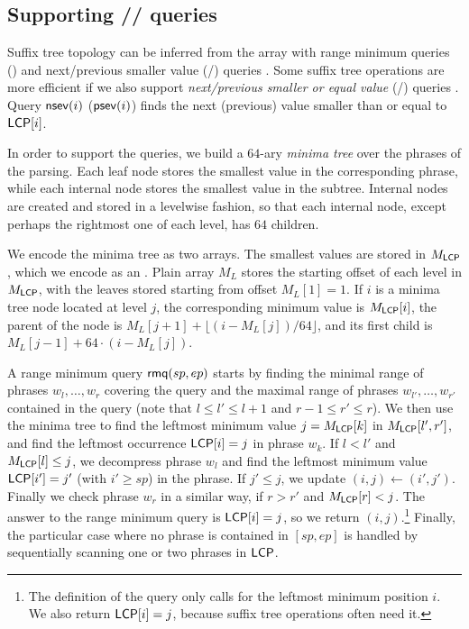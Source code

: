 \subsection{Supporting \nsv/\psv/\rmq{} queries}

Suffix tree topology can be inferred from the \LCP{} array with range minimum
queries (\rmq) and next/previous smaller value (\nsv/\psv) queries
\cite{Fischer2009a}. Some suffix tree operations are more efficient
if we also support \emph{next/previous smaller or equal value} (\nsev/\psev)
queries \cite{Abeliuk2013}. Query $\mathsf{nsev}(i)$ ($\mathsf{psev}(i)$) finds the next
(previous) value smaller than or equal to $\mathsf{LCP}[i]$.

In order to support the queries, we build a $64$-ary \emph{minima tree} over
the phrases of the \RLZ{} parsing. Each leaf node stores the smallest \LCP{}
value in the corresponding phrase, while each internal node stores the
smallest value in the subtree. Internal nodes are created and stored in a
levelwise fashion, so that each internal node, except perhaps the rightmost
one of each level, has $64$ children.

We encode the minima tree as two arrays. The smallest \LCP{} values are
stored in $M_{\mathsf{LCP}}$, which we encode as an \slarray. Plain array $M_{L}$
stores the starting offset of each level in $M_{\mathsf{LCP}}$, with the leaves
stored starting from offset $M_{L}[1] = 1$. If $i$ is a minima tree node
located at level $j$, the corresponding minimum value is $M_{\mathsf{LCP}}[i]$, the
parent of the node is $M_{L}[j+1] + \lfloor (i - M_{L}[j]) / 64 \rfloor$,
and its first child is $M_{L}[j-1] + 64 \cdot (i - M_{L}[j])$.

A range minimum query $\mathsf{rmq}(sp,ep)$ starts by finding the minimal range of
phrases $w_{l}, \dotsc, w_{r}$ covering the query and the maximal range of
phrases $w_{l'}, \dotsc, w_{r'}$ contained in the query (note that $l \le l' \le
l+1$ and $r-1 \le r' \le r$). We then use the
minima tree to find the leftmost minimum value $j = M_{\mathsf{LCP}}[k]$ in
$M_{\mathsf{LCP}}[l',r']$, and find the leftmost occurrence $\mathsf{LCP}[i] = j$ in phrase
$w_{k}$. If $l < l'$ and $M_{\mathsf{LCP}}[l] \le j$, we decompress phrase $w_{l}$
and find the leftmost minimum value $\mathsf{LCP}[i'] = j'$ (with $i' \ge sp$) in the
phrase. If $j' \le j$, we update $(i,j) \leftarrow (i',j')$. Finally we check
phrase $w_{r}$ in a similar way, if $r > r'$ and $M_{\mathsf{LCP}}[r] < j$. The answer
to the range minimum query is $\mathsf{LCP}[i] = j$, so we return
$(i,j)$.\footnote{The definition of the query only calls for the leftmost
minimum position $i$. We also return $\mathsf{LCP}[i] = j$, because suffix tree
operations often need it.} Finally, the particular case where no phrase is
contained in $[sp,ep]$ is handled by sequentially scanning one or two phrases
in $\textsf{LCP}$.

